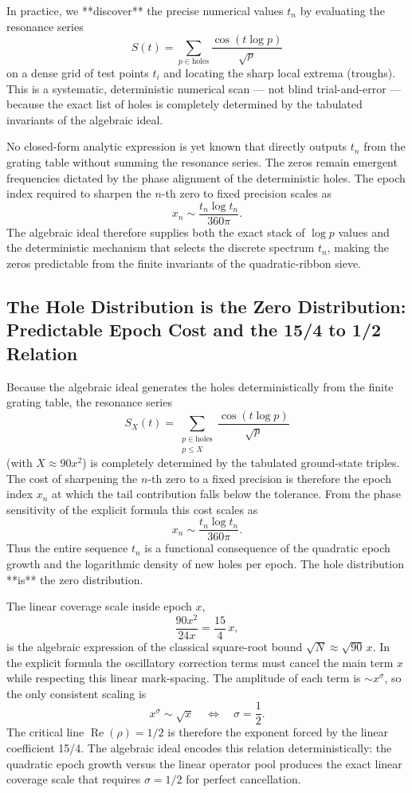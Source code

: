 \documentclass[11pt,a4paper]{article}
\begin{document}
In practice, we **discover** the precise numerical values \(t_n\) by evaluating the resonance series
\[
S(t)=\sum_{p\in\text{holes}}\frac{\cos(t\log p)}{\sqrt{p}}
\]
on a dense grid of test points \(t_i\) and locating the sharp local extrema (troughs). This is a systematic, deterministic numerical scan — not blind trial-and-error — because the exact list of holes is completely determined by the tabulated invariants of the algebraic ideal.

No closed-form analytic expression is yet known that directly outputs \(t_n\) from the grating table without summing the resonance series. The zeros remain emergent frequencies dictated by the phase alignment of the deterministic holes. The epoch index required to sharpen the \(n\)-th zero to fixed precision scales as
\[
x_n \sim \frac{t_n \log t_n}{360\pi}.
\]
The algebraic ideal therefore supplies both the exact stack of \(\log p\) values and the deterministic mechanism that selects the discrete spectrum \(t_n\), making the zeros predictable from the finite invariants of the quadratic-ribbon sieve.

\subsection{The Hole Distribution is the Zero Distribution: Predictable Epoch Cost and the 15/4 to 1/2 Relation}

Because the algebraic ideal generates the holes deterministically from the finite grating table, the resonance series
\[
S_X(t)=\sum_{\substack{p\in\text{holes}\\p\le X}}\frac{\cos(t\log p)}{\sqrt{p}}
\]
(with \(X\approx90x^2\)) is completely determined by the tabulated ground-state triples. The cost of sharpening the \(n\)-th zero to a fixed precision is therefore the epoch index \(x_n\) at which the tail contribution falls below the tolerance. From the phase sensitivity of the explicit formula this cost scales as
\[
x_n \sim \frac{t_n\log t_n}{360\pi}.
\]
Thus the entire sequence \(t_n\) is a functional consequence of the quadratic epoch growth and the logarithmic density of new holes per epoch. The hole distribution **is** the zero distribution.

The linear coverage scale inside epoch \(x\),
\[
\frac{90x^2}{24x}=\frac{15}{4}\,x,
\]
is the algebraic expression of the classical square-root bound \(\sqrt{N}\approx\sqrt{90}\,x\). In the explicit formula the oscillatory correction terms must cancel the main term \(x\) while respecting this linear mark-spacing. The amplitude of each term is \(\sim x^\sigma\), so the only consistent scaling is
\[
x^\sigma\sim\sqrt{x}\quad\Longleftrightarrow\quad\sigma=\frac12.
\]
The critical line \(\operatorname{Re}(\rho)=1/2\) is therefore the exponent forced by the linear coefficient 15/4. The algebraic ideal encodes this relation deterministically: the quadratic epoch growth versus the linear operator pool produces the exact linear coverage scale that requires \(\sigma=1/2\) for perfect cancellation.
\end{document}
